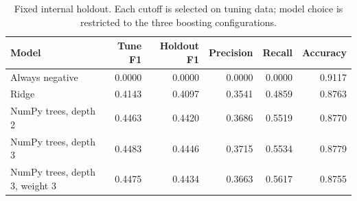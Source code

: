 \begin{table}[h]
\centering\small
\begin{tabular}{lrrrrr}
\toprule
Model & Tune F1 & Holdout F1 & Precision & Recall & Accuracy\\
\midrule
Always negative & 0.0000 & 0.0000 & 0.0000 & 0.0000 & 0.9117\\
Ridge & 0.4143 & 0.4097 & 0.3541 & 0.4859 & 0.8763\\
NumPy trees, depth 2 & 0.4463 & 0.4420 & 0.3686 & 0.5519 & 0.8770\\
NumPy trees, depth 3 & 0.4483 & 0.4446 & 0.3715 & 0.5534 & 0.8779\\
NumPy trees, depth 3, weight 3 & 0.4475 & 0.4434 & 0.3663 & 0.5617 & 0.8755\\
\bottomrule
\end{tabular}
\caption{Fixed internal holdout. Each cutoff is selected on tuning data; model choice is restricted to the three boosting configurations.}
\end{table}
